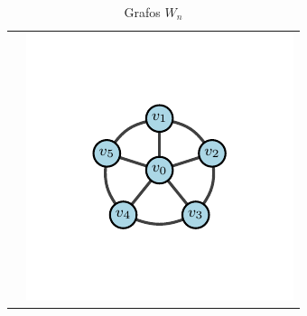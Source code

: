 \begin{table}[H]
\begin{center}
\begin{tabular}{cc}
                    &
                    \includegraphics{Sections/Graphs/GraphsImages/GraphsWn/W5.pdf}
                \end{tabular}
              \caption{Grafos $W_n$}
              \label{tbl:grafosTn}
            \end{center}
        \end{table}